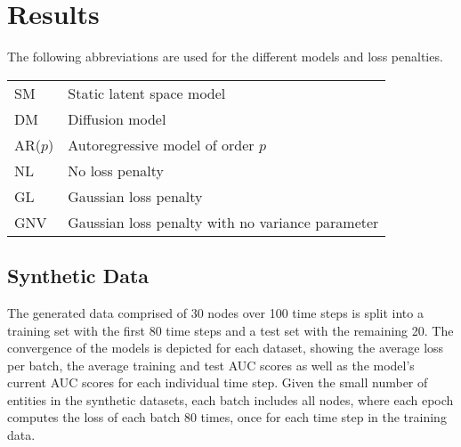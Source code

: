 \chapter{Results}\label{ch:Results}

The following abbreviations are used for the different models and loss penalties.
\begin{tabular}{l|l}
    SM & Static latent space model \\
    DM & Diffusion model \\
    AR($p$) & Autoregressive model of order $p$ \\
    NL & No loss penalty \\
    GL & Gaussian loss penalty \\
    GNV & Gaussian loss penalty with no variance parameter
\end{tabular}

\section{Synthetic Data}

The generated data comprised of 30 nodes over 100 time steps is split into a training set with the first 80 time steps and a test set with the remaining 20. 
The convergence of the models is depicted for each dataset, showing the average loss per batch, the average training and test AUC scores as well as the model's current AUC scores for each individual time step. 
Given the small number of entities in the synthetic datasets, each batch includes all nodes, where each epoch computes the loss of each batch 80 times, once for each time step in the training data. 


